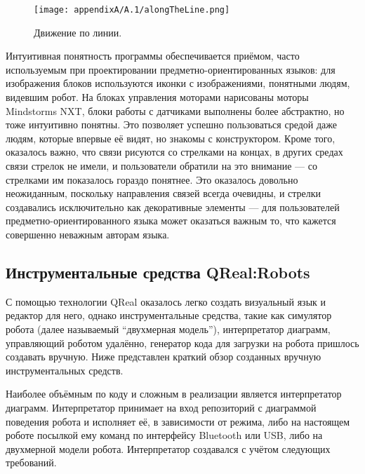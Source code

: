 \begin{figure} [ht]
	\begin{center}
		\texttt{[image: appendixA/A.1/alongTheLine.png]}
		\caption{Движение по линии.}
		\label{image:alongTheLine}
	\end{center}
\end{figure}

Интуитивная понятность программы обеспечивается приёмом, часто используемым при проектировании 
предметно-ориентированных языков: для изображения блоков используются иконки с изображениями, 
понятными людям, видевшим робот. На блоках управления моторами нарисованы моторы Mindstorms NXT, 
блоки работы с датчиками выполнены более абстрактно, но тоже интуитивно понятны. Это 
позволяет успешно пользоваться средой даже людям, которые впервые её видят, но знакомы 
с конструктором. Кроме того, оказалось важно, что связи рисуются со стрелками на концах, 
в других средах связи стрелок не имели, и пользователи обратили на это внимание --- 
со стрелками им показалось гораздо понятнее. Это оказалось довольно неожиданным, поскольку 
направления связей всегда очевидны, и стрелки создавались исключительно как декоративные 
элементы --- для пользователей предметно-ориентированного языка может оказаться важным 
то, что кажется совершенно неважным авторам языка.

\subsection{Инструментальные средства QReal:Robots}
С помощью технологии QReal оказалось легко создать визуальный язык и редактор для него, 
однако инструментальные средства, такие как симулятор робота (далее называемый "`двухмерная модель"'), 
интерпретатор диаграмм, управляющий роботом удалённо, генератор кода для загрузки на 
робота пришлось создавать вручную. Ниже представлен краткий обзор созданных вручную 
инструментальных средств.

Наиболее объёмным по коду и сложным в реализации является интерпретатор диаграмм. 
Интерпретатор принимает на вход репозиторий с диаграммой поведения робота и исполняет 
её, в зависимости от режима, либо на настоящем роботе посылкой ему команд по интерфейсу 
Bluetooth или USB, либо на двухмерной модели робота. Интерпретатор создавался с учётом 
следующих требований.

